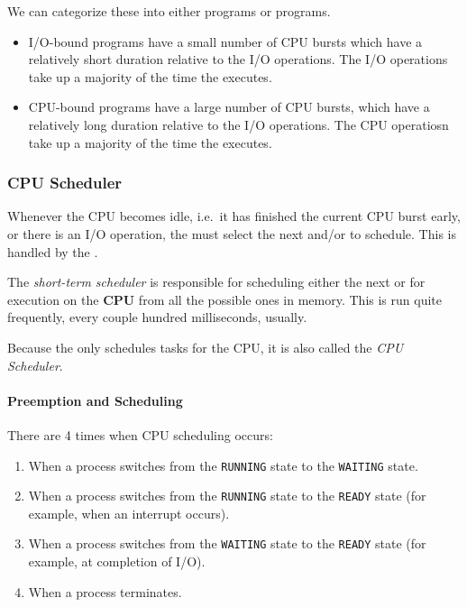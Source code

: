 We can categorize these into either  programs or  programs.
\begin{itemize}[noitemsep]
\item I/O-bound programs have a small number of CPU bursts which have a relatively short duration relative to the I/O operations.
  The I/O operations take up a majority of the time the  executes.
\item CPU-bound programs have a large number of CPU bursts, which have a relatively long duration relative to the I/O operations.
  The CPU operatiosn take up a majority of the time the  executes.
\end{itemize}

\subsubsection{CPU Scheduler}\label{subsubsec:CPU_Scheduler}
Whenever the CPU becomes idle, i.e.\ it has finished the current CPU burst early, or there is an I/O operation, the  must select the next  and/or  to schedule.
This is handled by the .

\begin{definition}\label{def:Short_Term_Scheduler}
  The \emph{short-term scheduler} is responsible for scheduling either the next  or  for execution on the \textbf{CPU} from all the possible ones in memory.
  This is run quite frequently, every couple hundred milliseconds, usually.

  \begin{remark}\label{rmk:CPU_Scheduler}
    Because the  only schedules tasks for the CPU, it is also called the \emph{CPU Scheduler}.
  \end{remark}
\end{definition}

\paragraph{Preemption and Scheduling}\label{par:Preemption_Scheduling}
There are 4 times when CPU scheduling occurs:
\begin{enumerate}[noitemsep]
\item When a process switches from the \texttt{RUNNING} state to the \texttt{WAITING} state.
\item When a process switches from the \texttt{RUNNING} state to the \texttt{READY} state (for example, when an interrupt occurs).
\item When a process switches from the \texttt{WAITING} state to the \texttt{READY} state (for example, at completion of I/O).
\item When a process terminates.
\end{enumerate}

